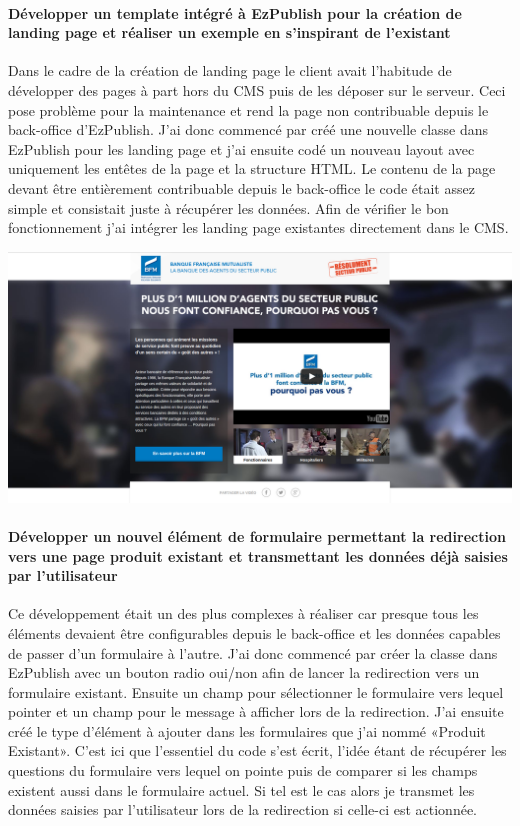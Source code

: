 \documentclass[a4paper,11pt,twoside]{report}
\begin{document}
      \paragraph*{Développer un template intégré à EzPublish pour la création de landing page et réaliser un exemple en s'inspirant de l'existant}
      Dans le cadre de la création de landing page le client avait l'habitude de développer des pages à part hors du CMS puis de les déposer sur le serveur. Ceci pose problème pour la maintenance et rend la page non contribuable depuis le back-office d'EzPublish. J'ai donc commencé par créé une nouvelle classe dans EzPublish pour les landing page et j'ai ensuite codé un nouveau layout avec uniquement les entêtes de la page et la structure HTML. Le contenu de la page devant être entièrement contribuable depuis le back-office le code était assez simple et consistait juste à récupérer les données. Afin de vérifier le bon fonctionnement j'ai intégrer les landing page existantes directement dans le CMS.
      \begin{center}
	\includegraphics[width=\textwidth]{images/landing_page1.png} 
	\label{landing_page}
      \end{center}
      \paragraph*{Développer un nouvel élément de formulaire permettant la redirection vers une page produit existant et transmettant les données déjà saisies par l'utilisateur}
      Ce développement était un des plus complexes à réaliser car presque tous les éléments devaient être configurables depuis le back-office et les données capables de passer d'un formulaire à l'autre. J'ai donc commencé par créer la classe dans EzPublish avec un bouton radio oui/non afin de lancer la redirection vers un formulaire existant. Ensuite un champ pour sélectionner le formulaire vers lequel pointer et un champ pour le message à afficher lors de la redirection. 
      J'ai ensuite créé le type d'élément à ajouter dans les formulaires que j'ai nommé «Produit Existant». C'est ici que l'essentiel du code s'est écrit, l'idée étant de récupérer les questions du formulaire vers lequel on pointe puis de comparer si les champs existent aussi dans le formulaire actuel. Si tel est le cas alors je transmet les données saisies par l'utilisateur lors de la redirection si celle-ci est actionnée. 
      
\end{document}
